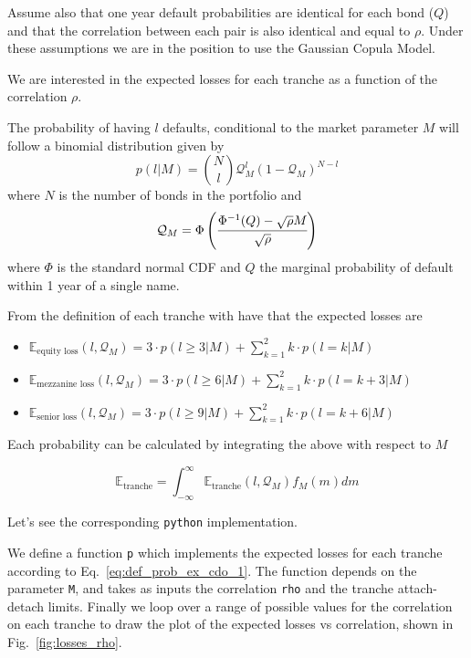 Assume also that one year default probabilities are identical for each bond ($Q$) and that the correlation between each pair is also identical and equal to $\rho$. Under these assumptions we are in the position to use the Gaussian Copula Model. 

We are interested in the expected losses for each tranche as a function of the correlation $\rho$.

The probability of having $l$ defaults, conditional to the market parameter $M$ will follow a binomial distribution given by
\begin{equation}
p(l|M) = \binom{N}{l}\mathcal{Q}_M^l (1-\mathcal{Q}_M)^{N-l}
\label{eq:def_prob_ex_cdo_1}
\end{equation}
where $N$ is the number of bonds in the portfolio and 
\begin{equation}
\mathcal{Q}_M = \Phi\left(\cfrac{\Phi^{-1}(Q)-\sqrt{\rho}M}{\sqrt{\-\rho}}\right)
\end{equation}
where $\Phi$ is the standard normal CDF and $Q$ the marginal probability of default within 1 year of a single name.

From the definition of each tranche with have that the expected losses are
\begin{itemize}
	\item $\mathbb{E}_{\textrm{equity loss}}(l, \mathcal{Q}_M)=3\cdot p(l\ge 3|M) + \sum_{k=1}^{2}k\cdot p(l=k|M)$
	\item $\mathbb{E}_{\textrm{mezzanine loss}}(l, \mathcal{Q}_M)=3\cdot p(l\ge 6|M) + \sum_{k=1}^{2}k\cdot p(l=k+3|M)$
	\item $\mathbb{E}_{\textrm{senior loss}}(l, \mathcal{Q}_M)=3\cdot p(l\ge 9|M) + \sum_{k=1}^{2}k\cdot p(l=k+6|M)$
\end{itemize}
	
Each probability can be calculated by integrating the above with respect to $M$
	
\begin{equation} 
\mathbb{E}_{\mathrm{tranche}} = \int_{-\infty}^{\infty}{\mathbb{E}_{\mathrm{tranche}}(l, \mathcal{Q}_M) f_M(m)dm}
\end{equation}

Let's see the corresponding \texttt{python} implementation.


We define a function \texttt{p} which implements the expected losses for each tranche according to Eq.~\ref{eq:def_prob_ex_cdo_1}.
The function depends on the parameter \texttt{M}, and takes as inputs the correlation \texttt{rho} and the tranche attach-detach limits.
Finally we loop over a range of possible values for the correlation on each tranche to draw the plot of the expected losses vs correlation, shown in Fig.~\ref{fig:losses_rho}.


